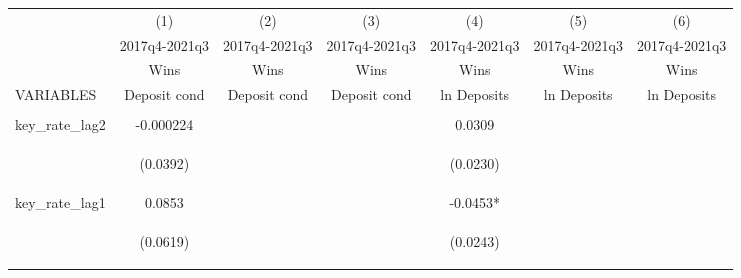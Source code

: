 \documentclass[]{article}
\begin{document}
\begin{center}
\begin{tabular}{lcccccc} \hline
 & (1) & (2) & (3) & (4) & (5) & (6) \\
 & 2017q4-2021q3 & 2017q4-2021q3 & 2017q4-2021q3 & 2017q4-2021q3 & 2017q4-2021q3 & 2017q4-2021q3 \\
 & Wins & Wins & Wins & Wins & Wins & Wins \\
VARIABLES & Deposit cond & Deposit cond & Deposit cond & ln Deposits & ln Deposits & ln Deposits \\ \hline
\vspace{4pt} & \begin{footnotesize}\end{footnotesize} & \begin{footnotesize}\end{footnotesize} & \begin{footnotesize}\end{footnotesize} & \begin{footnotesize}\end{footnotesize} & \begin{footnotesize}\end{footnotesize} & \begin{footnotesize}\end{footnotesize} \\
key\_rate\_lag2 & -0.000224 &  &  & 0.0309 &  &  \\
\vspace{4pt} & \begin{footnotesize}(0.0392)\end{footnotesize} & \begin{footnotesize}\end{footnotesize} & \begin{footnotesize}\end{footnotesize} & \begin{footnotesize}(0.0230)\end{footnotesize} & \begin{footnotesize}\end{footnotesize} & \begin{footnotesize}\end{footnotesize} \\
key\_rate\_lag1 & 0.0853 &  &  & -0.0453* &  &  \\
\vspace{4pt} & \begin{footnotesize}(0.0619)\end{footnotesize} & \begin{footnotesize}\end{footnotesize} & \begin{footnotesize}\end{footnotesize} & \begin{footnotesize}(0.0243)\end{footnotesize} & \begin{footnotesize}\end{footnotesize} & \begin{footnotesize}\end{footnotesize} \\

\end{tabular}
\end{center}
\end{document}
